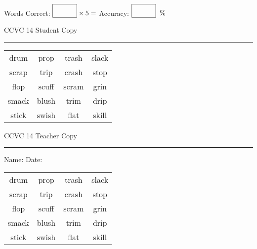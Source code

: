 \documentclass{memoir}
\begin{document}
\small

Words Correct: $\fbox{\phantom{\huge 100}} \times 5 = $ Accuracy: $\fbox{\phantom{\huge 100}}\;\; \%$ 

\vfill

\newpage


\footnotesize \noindent
CCVC 14 \hfill Student Copy
\smallskip
\hrule

\Large

\setlength{\tabcolsep}{14pt}
\def\arraystretch{3}

{\selectfont


\begin{vplace}[0.5]
\begin{center}
\begin{tabular}{cccc}
drum & prop & trash & slack            \\
scrap & trip & crash & stop \\
flop & scuff & scram & grin     \\
smack & blush & trim & drip \\
stick & swish & flat             & skill \\
\end{tabular}
\end{center}
\end{vplace}

}

\newpage

\footnotesize \noindent
CCVC 14 \hfill Teacher Copy
\smallskip
\hrule

\small

\vfill

\noindent
Name: \underline{\hspace{1.75in}} \hfill Date: \underline{\hspace{1in}}

\Large

{\selectfont


\begin{vplace}[0.5]
\begin{center}
\begin{tabular}{cccc}
drum & prop & trash & slack            \\
scrap & trip & crash & stop \\
flop & scuff & scram & grin     \\
smack & blush & trim & drip \\
stick & swish & flat             & skill \\
\end{tabular}
\end{center}
\end{vplace}



}
\end{document}
